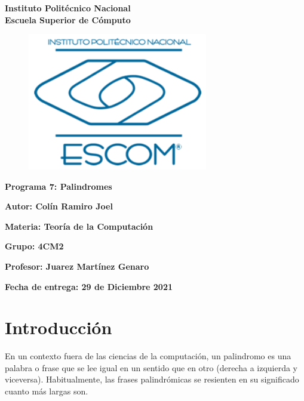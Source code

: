 \documentclass{article}
\begin{document}
	\begin{titlepage}
		\begin{center}
			{\huge\textbf{Instituto Politécnico Nacional}}\\
			\vspace{7mm}
			{\huge\textbf{Escuela Superior de Cómputo}}\\			
			\begin{figure}[h]
				\centering
				\includegraphics[height = 6cm]{logoEscom.png}
			\end{figure}	
			\vspace{1cm}
			{\huge\textbf{Programa 7: Palindromes}}
			\par\vspace{2cm}
			\large\textbf{Autor: Colín Ramiro Joel}
			\par\vspace{1cm}
			{\large\textbf{Materia: Teoría de la Computación}}
			\par\vspace{1cm}
			{\large\textbf{Grupo: 4CM2}}
			\par\vspace{1cm}
			{\large\textbf{Profesor: Juarez Martínez Genaro}}
			\par\vspace{1cm}
			{\large\textbf{Fecha de entrega: {\huge{29 de Diciembre 2021}}}}
			\par\vspace{3cm}
		\end{center}
	\end{titlepage}	
	
	\section*{Introducción}
	En un contexto fuera de las ciencias de la computación, un palindromo es una palabra o frase que se lee igual en un sentido que en otro (derecha a izquierda y viceversa). Habitualmente, las frases palindrómicas se resienten en su significado cuanto más largas son. 
	
\end{document}
